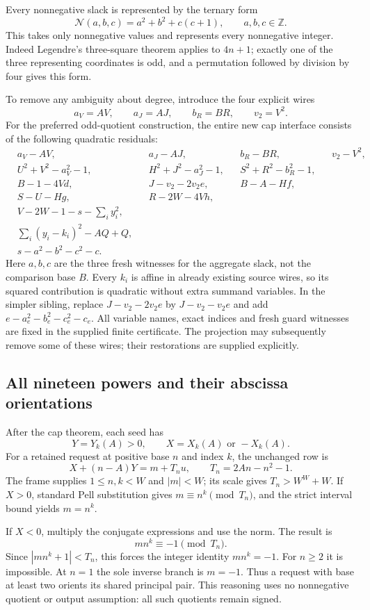 Every nonnegative slack is represented by the ternary form
\[
 \mathcal N(a,b,c)=a^2+b^2+c(c+1),\qquad a,b,c\in\mathbb Z.
\]
This takes only nonnegative values and represents every nonnegative
integer. Indeed Legendre's three-square theorem applies to $4n+1$;
exactly one of the three representing coordinates is odd, and a
permutation followed by division by four gives this form.

To remove any ambiguity about degree, introduce the four explicit
wires
\[
 a_V=AV,\qquad a_J=AJ,\qquad b_R=BR,\qquad v_2=V^2.
\]
For the preferred odd-quotient construction, the entire new cap
interface consists of the following quadratic residuals:
\[
\begin{aligned}
 &a_V-AV, &&a_J-AJ, &&b_R-BR, &&v_2-V^2,\\
 &U^2+V^2-a_V^2-1,
 &&H^2+J^2-a_J^2-1,
 &&S^2+R^2-b_R^2-1,\\
 &B-1-4Vd,
 &&J-v_2-2v_2e,
 &&B-A-Hf,\\
 &S-U-Hg,
 &&R-2W-4Vh,\\
 &V-2W-1-s-\sum_i y_i^2,\\
 &\sum_i(y_i-k_i)^2-AQ+Q,\\
 &s-a^2-b^2-c^2-c.
\end{aligned}
\]
Here $a,b,c$ are the three fresh witnesses for the aggregate
slack, not the comparison base $B$. Every $k_i$ is affine in
already existing source wires, so its squared contribution is
quadratic without extra summand variables. In the simpler sibling,
replace $J-v_2-2v_2e$ by $J-v_2-v_2e$ and add
$e-a_e^2-b_e^2-c_e^2-c_e$. All variable names, exact indices and
fresh guard witnesses are fixed in the supplied finite certificate.
The projection may subsequently remove some of these wires; their
restorations are supplied explicitly.

\subsection{All nineteen powers and their abscissa orientations}
After the cap theorem, each seed has
\[
 Y=Y_k(A)>0,\qquad X= X_k(A)\text{ or }-X_k(A).
\]
For a retained request at positive base $n$ and index $k$, the
unchanged row is
\[
 X+(n-A)Y=m+T_nu,\qquad T_n=2An-n^2-1.
\]
The frame supplies $1\leq n,k<W$ and $|m|<W$; its scale gives
$T_n>W^W+W$. If $X>0$, standard Pell substitution gives
$m\equiv n^k\pmod{T_n}$, and the strict interval bound yields
$m=n^k$.

If $X<0$, multiply the conjugate expressions and use the norm.
The result is
\[
 mn^k\equiv-1\pmod{T_n}.
\]
Since $|mn^k+1|<T_n$, this forces the integer identity $mn^k=-1$.
For $n\geq2$ it is impossible. At $n=1$ the sole inverse branch
is $m=-1$. Thus a request with base at least two orients its shared
principal pair. This reasoning uses no nonnegative quotient or
output assumption: all such quotients remain signed.

